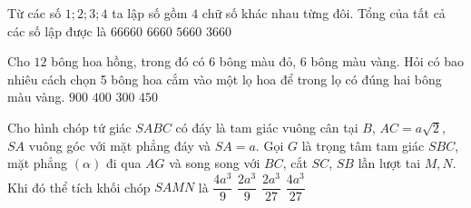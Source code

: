 \begin{ex}%
Từ các số $ 1; 2; 3; 4$ ta lập số gồm $4$ chữ số khác nhau từng đôi. Tổng của tất cả các số lập được là
\choice
{\True $66660$}
{$6660$}
{$5660$}
{$3660$}
\end{ex}

\begin{ex}%
Cho $12$ bông hoa hồng, trong đó có $6$ bông màu đỏ, $6$ bông màu vàng. Hỏi có bao nhiêu cách chọn 5 bông hoa cắm vào một lọ hoa để trong lọ có đúng hai bông màu vàng.
\choice
{$900$}
{$400$}
{\True $300$}
{$450$}
\end{ex}

\begin{ex}%
Cho hình chóp tứ giác $S ABC$ có đáy là tam giác vuông cân tại $B$, $AC=a\sqrt{2}$, $SA$ vuông góc với mặt phẳng đáy và $SA=a$. Gọi $G$ là trọng tâm tam giác $SBC$, mặt phẳng $(\alpha)$ đi qua $AG$ và song song với $BC$, cắt $SC$, $SB$ lần lượt tai $M, N$. Khi đó thể tích khối chóp $S AMN$ là 
\choice
{$\dfrac{4a^3}{9}$}
{$\dfrac{2a^3}{9}$}
{\True $\dfrac{2a^3}{27}$}
{$\dfrac{4a^3}{27}$}
\end{ex}
